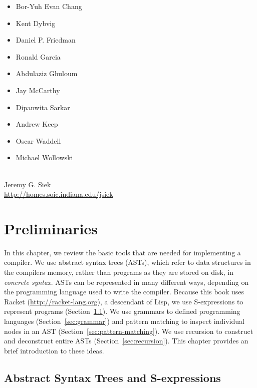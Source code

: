 \documentclass[11pt]{book}
\begin{document}
\begin{itemize}
\item Bor-Yuh Evan Chang
\item Kent Dybvig
\item Daniel P. Friedman
\item Ronald Garcia
\item Abdulaziz Ghuloum
\item Jay McCarthy
\item Dipanwita Sarkar
\item Andrew Keep
\item Oscar Waddell
\item Michael Wollowski
\end{itemize}

\mbox{}\\
\noindent Jeremy G. Siek \\
\noindent \url{http://homes.soic.indiana.edu/jsiek} \\


\chapter{Preliminaries}
\label{ch:trees-recur}

In this chapter, we review the basic tools that are needed for implementing a
compiler. We use abstract syntax trees (ASTs), which refer to data structures in
the compilers memory, rather than programs as they are stored on disk, in
\emph{concrete syntax}.
%
ASTs can be represented in many different ways, depending on the programming
language used to write the compiler.
%
Because this book uses Racket (\url{http://racket-lang.org}), a
descendant of Lisp, we use S-expressions to represent programs
(Section~\ref{sec:ast}). We use grammars to defined programming languages
(Section~\ref{sec:grammar}) and pattern matching to inspect
individual nodes in an AST (Section~\ref{sec:pattern-matching}).  We
use recursion to construct and deconstruct entire ASTs
(Section~\ref{sec:recursion}).  This chapter provides an brief
introduction to these ideas.

\section{Abstract Syntax Trees and S-expressions}
\label{sec:ast}
\end{document}
